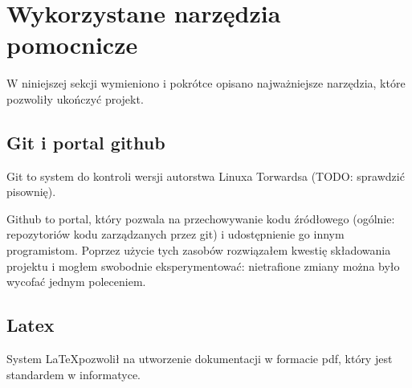 \documentclass[10pt,leqno]{article}
\begin{document}
\newpage

\section{Wykorzystane narzędzia pomocnicze}

W niniejszej sekcji wymieniono i pokrótce opisano najważniejsze narzędzia, które pozwoliły ukończyć projekt.

\subsection{Git i portal github}
Git \cite{git} to system do kontroli wersji autorstwa Linuxa Torwardsa (TODO: sprawdzić pisownię). 

Github \cite{github} to portal, który pozwala
na przechowywanie kodu źródłowego (ogólnie: repozytoriów kodu zarządzanych przez git) i udostępnienie go innym programistom.
Poprzez użycie tych zasobów rozwiązałem kwestię składowania projektu i mogłem swobodnie eksperymentować: nietrafione zmiany
można było wycofać jednym poleceniem.

\subsection{Latex}
System \LaTeX pozwolił na utworzenie dokumentacji w formacie pdf, który jest standardem w informatyce.
\end{document}
